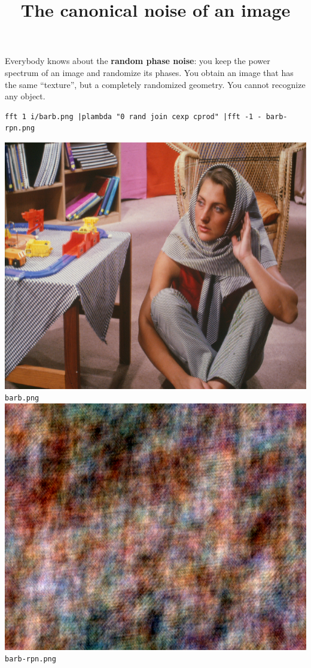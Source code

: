 \title{The canonical noise of an image}

Everybody knows about the {\bf random phase noise}: you keep the power
spectrum of an image and randomize its phases.  You obtain an image that has
the same ``texture'', but a completely randomized geometry.  You cannot
recognize any object.

\begin{verbatim}
fft 1 i/barb.png |plambda "0 rand join cexp cprod" |fft -1 - barb-rpn.png
\end{verbatim}
\includegraphics{i/barb.png}\verb+barb.png+\newline
\includegraphics{barb-rpn.png}\verb+barb-rpn.png+

